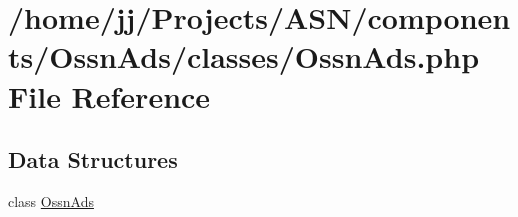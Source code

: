 \hypertarget{_ossn_ads_8php}{}\section{/home/jj/\+Projects/\+A\+S\+N/components/\+Ossn\+Ads/classes/\+Ossn\+Ads.php File Reference}
\label{_ossn_ads_8php}
\subsection*{Data Structures}
\begin{DoxyCompactItemize}
\item 
class \hyperlink{class_ossn_ads}{Ossn\+Ads}
\end{DoxyCompactItemize}
